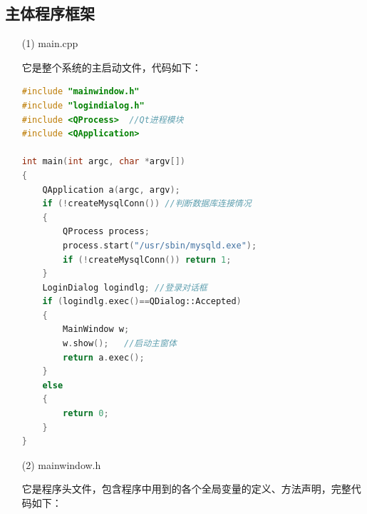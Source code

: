 \documentclass{progartcn}
\begin{document}
\subsection{主体程序框架}

\begin{enumerate}[itemsep=0.01pt]
	\item[(1)]main.cpp

它是整个系统的主启动文件，代码如下：

\begin{lstlisting}[language=c++]
#include "mainwindow.h"
#include "logindialog.h"
#include <QProcess>  //Qt进程模块
#include <QApplication>

int main(int argc, char *argv[])
{
	QApplication a(argc, argv);
	if (!createMysqlConn()) //判断数据库连接情况
	{
		QProcess process;
		process.start("/usr/sbin/mysqld.exe");
		if (!createMysqlConn()) return 1;
	}
	LoginDialog logindlg; //登录对话框
	if (logindlg.exec()==QDialog::Accepted)
	{
		MainWindow w;
		w.show();   //启动主窗体
		return a.exec();
	}
	else
	{
		return 0;
	}
}

\end{lstlisting}

\item[(2)]mainwindow.h

它是程序头文件，包含程序中用到的各个全局变量的定义、方法声明，完整代码如下：


\end{enumerate}
\end{document}

